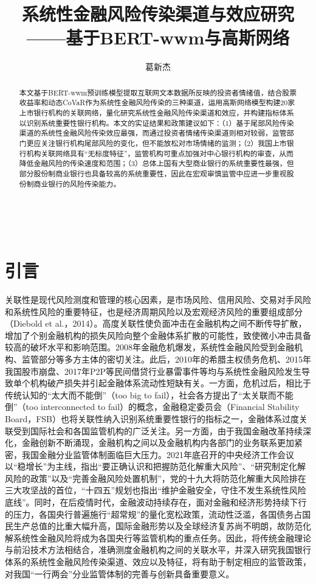\documentclass[lang=cn]{elegantpaper}
\title{\vspace{-2cm}系统性金融风险传染渠道与效应研究\\{\large——基于BERT-wwm与高斯网络}}
\author{葛新杰}
\date{}
\begin{document}
\maketitle
\makeatletter
　　\def\@cite#1#2{\textsuperscript{[{#1\if@tempswa , #2\fi}]}}
\makeatother

\vspace{-1cm}
\begin{abstract}\vspace{-0.7cm}

本文基于BERT-wwm预训练模型提取互联网文本数据所反映的投资者情绪值，结合股票收益率和动态CoVaR作为系统性金融风险传染的三种渠道，运用高斯网络模型构建20家上市银行机构的关联网络，量化研究系统性金融风险传染渠道和效应，并构建指标体系以识别系统重要性银行机构。本文的实证结果和政策建议如下：（1）基于尾部风险传染渠道的系统性金融风险传染效应最强，而通过投资者情绪传染渠道则相对较弱，监管部门更应关注银行机构尾部风险的变化，但不能放松对市场情绪的监测；（2）我国上市银行机构关联网络具有“无标度特征”，监管机构可重点加强对中心银行机构的审查，从而降低金融风险的传染速度和范围；（3）总体上国有大型商业银行的系统重要性最强，但部分股份制商业银行也具备较高的系统重要性，因此在宏观审慎监管中应进一步重视股份制商业银行的风险传染能力。
\end{abstract}

\section{引言}
关联性是现代风险测度和管理的核心因素，是市场风险、信用风险、交易对手风险和系统性风险的重要特征，也是经济周期风险以及宏观经济风险的重要组成部分（Diebold et al.，2014）。高度关联性使负面冲击在金融机构之间不断传导扩散，增加了个别金融机构的损失风险向整个金融体系扩散的可能性，致使微小冲击具备较高的破坏水平和影响范围。2008年金融危机爆发，系统性金融风险受到金融机构、监管部分等多方主体的密切关注。此后，2010年的希腊主权债务危机、2015年我国股市崩盘、2017年P2P等民间借贷行业暴雷事件等均与系统性金融风险发生导致单个机构破产损失并引起金融体系流动性短缺有关。一方面，危机过后，相比于传统认知的“太大而不能倒”（too big to fail），社会各方提出了“太关联而不能倒”（too interconnected to fail）的概念，金融稳定委员会（Financial Stability Board，FSB）也将关联性纳入识别系统重要性银行的指标之一，金融体系过度关联受到国际社会和各国监管机构的广泛关注。另一方面，由于我国金融改革持续深化，金融创新不断涌现，金融机构之间以及金融机构内各部门的业务联系更加紧密，我国金融分业监管体制面临巨大压力。2021年底召开的中央经济工作会议以“稳增长”为主线，指出“要正确认识和把握防范化解重大风险”、“研究制定化解风险的政策”以及“完善金融风险处置机制”，党的十九大将防范化解重大风险排在三大攻坚战的首位，“十四五”规划也指出“维护金融安全，守住不发生系统性风险底线”。同时，在后疫情时代，金融波动持续存在，面对金融和经济形势持续下行的压力，各国央行普遍施行“超常规”的量化宽松政策，流动性泛滥，各国债务占国民生产总值的比重大幅升高，国际金融形势以及全球经济复苏尚不明朗，故防范化解系统性金融风险将成为各国央行等监管机构的重点任务。因此，将传统金融理论与前沿技术方法相结合，准确测度金融机构之间的关联水平，并深入研究我国银行体系的系统性金融风险传染渠道、效应以及特征，将有助于制定相应的监管政策，对我国“一行两会”分业监管体制的完善与创新具备重要意义。
\end{document}
